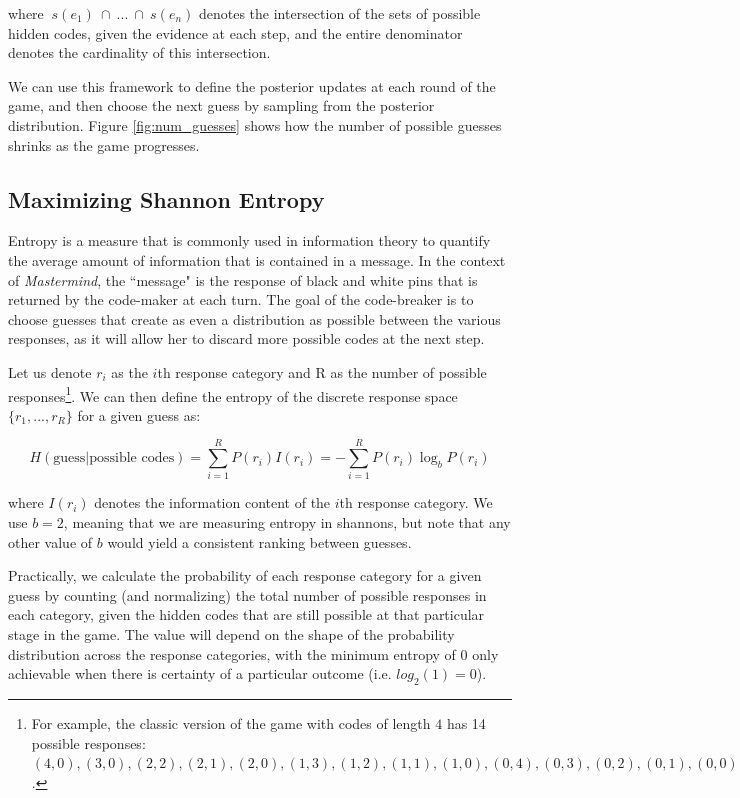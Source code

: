 \documentclass[11pt]{article}
\begin{document}
\noindent where $\ s(e_1) \ \cap \ ... \ \cap \ s(e_n)$ denotes the intersection of the sets of possible hidden codes, given the evidence at each step, and the entire denominator denotes the cardinality of this intersection.

We can use this framework to define the posterior updates at each round of the game, and then choose the next guess by sampling from the posterior distribution. Figure \ref{fig:num_guesses} shows how the number of possible guesses shrinks as the game progresses.

\subsection{Maximizing Shannon Entropy}

Entropy is a measure that is commonly used in information theory to quantify the average amount of information that is contained in a message. In the context of \textit{Mastermind}, the ``message" is the response of black and white pins that is returned by the code-maker at each turn. The goal of the code-breaker is to choose guesses that create as even a distribution as possible between the various responses, as it will allow her to discard more possible codes at the next step.

Let us denote $r_i$ as the $i$th response category and R as the number of possible responses\footnote{For example, the classic version of the game with codes of length $4$ has 14 possible responses: $(4, 0), (3, 0), (2, 2), (2, 1), (2, 0), (1, 3), (1, 2), (1, 1), (1, 0), (0, 4), (0, 3), (0, 2), (0, 1), (0, 0)$.}. We can then define the entropy of the discrete response space $\{r_1, ... , r_R\}$ for a given guess as:

\[
H(\text{guess} | \text{possible codes}) = \sum_{i=1}^R P(r_i) I(r_i) = - \sum_{i=1}^R P(r_i) \log_bP(r_i)
\]

\noindent where $I(r_i)$ denotes the information content of the $i$th response category. We use $b=2$, meaning that we are measuring entropy in shannons, but note that any other value of $b$ would yield a consistent ranking between guesses.

Practically, we calculate the probability of each response category for a given guess by counting (and normalizing) the total number of possible responses in each category, given the hidden codes that are still possible at that particular stage in the game. The value will depend on the shape of the probability distribution across the response categories, with the minimum entropy of $0$ only achievable when there is certainty of a particular outcome (i.e. $log_2(1)=0$).
\end{document}
